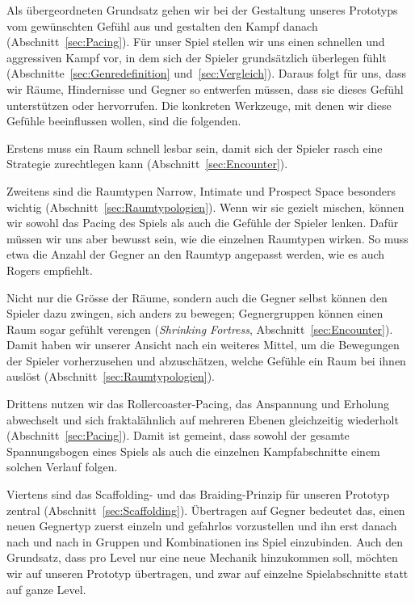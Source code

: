 \documentclass[../Main.tex]{subfiles}
\begin{document}
Als übergeordneten Grundsatz gehen wir bei der Gestaltung unseres Prototyps vom gewünschten Gefühl aus und gestalten den Kampf danach (Abschnitt~\ref{sec:Pacing}). Für unser Spiel stellen wir uns einen schnellen und aggressiven Kampf vor, in dem sich der Spieler grundsätzlich überlegen fühlt (Abschnitte~\ref{sec:Genredefinition} und~\ref{sec:Vergleich}). Daraus folgt für uns, dass wir Räume, Hindernisse und Gegner so entwerfen müssen, dass sie dieses Gefühl unterstützen oder hervorrufen. Die konkreten Werkzeuge, mit denen wir diese Gefühle beeinflussen wollen, sind die folgenden.

Erstens muss ein Raum schnell lesbar sein, damit sich der Spieler rasch eine Strategie zurechtlegen kann (Abschnitt~\ref{sec:Encounter}).

Zweitens sind die Raumtypen Narrow, Intimate und Prospect Space besonders wichtig (Abschnitt~\ref{sec:Raumtypologien}). Wenn wir sie gezielt mischen, können wir sowohl das Pacing des Spiels als auch die Gefühle der Spieler lenken. Dafür müssen wir uns aber bewusst sein, wie die einzelnen Raumtypen wirken. So muss etwa die Anzahl der Gegner an den Raumtyp angepasst werden, wie es auch Rogers empfiehlt.

Nicht nur die Grösse der Räume, sondern auch die Gegner selbst können den Spieler dazu zwingen, sich anders zu bewegen; Gegnergruppen können einen Raum sogar gefühlt verengen (\textit{Shrinking Fortress}, Abschnitt~\ref{sec:Encounter}). Damit haben wir unserer Ansicht nach ein weiteres Mittel, um die Bewegungen der Spieler vorherzusehen und abzuschätzen, welche Gefühle ein Raum bei ihnen auslöst (Abschnitt~\ref{sec:Raumtypologien}).

Drittens nutzen wir das Rollercoaster-Pacing, das Anspannung und Erholung abwechselt und sich fraktalähnlich auf mehreren Ebenen gleichzeitig wiederholt (Abschnitt~\ref{sec:Pacing}). Damit ist gemeint, dass sowohl der gesamte Spannungsbogen eines Spiels als auch die einzelnen Kampfabschnitte einem solchen Verlauf folgen.

Viertens sind das Scaffolding- und das Braiding-Prinzip für unseren Prototyp zentral (Abschnitt~\ref{sec:Scaffolding}). Übertragen auf Gegner bedeutet das, einen neuen Gegnertyp zuerst einzeln und gefahrlos vorzustellen und ihn erst danach nach und nach in Gruppen und Kombinationen ins Spiel einzubinden. Auch den Grundsatz, dass pro Level nur eine neue Mechanik hinzukommen soll, möchten wir auf unseren Prototyp übertragen, und zwar auf einzelne Spielabschnitte statt auf ganze Level.
\end{document}
